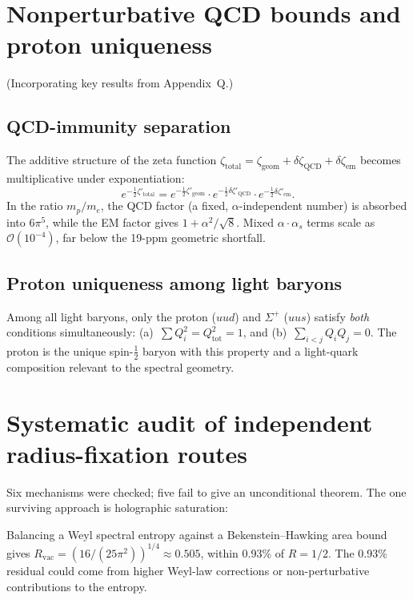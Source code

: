 \documentclass[11pt,a4paper]{article}
\begin{document}
\section{Nonperturbative QCD bounds and proton uniqueness}
\label{app:qcd}
(Incorporating key results from Appendix~Q.)

\subsection{QCD-immunity separation}
The additive structure of the zeta function
$\zeta_{\mathrm{total}}=\zeta_{\mathrm{geom}}+\delta\zeta_{\mathrm{QCD}}
+\delta\zeta_{\mathrm{em}}$ becomes multiplicative under exponentiation:
\[
  e^{-\frac12\zeta'_{\mathrm{total}}}
  = e^{-\frac12\zeta'_{\mathrm{geom}}}\cdot
    e^{-\frac12\delta\zeta'_{\mathrm{QCD}}}\cdot
    e^{-\frac12\delta\zeta'_{\mathrm{em}}}.
\]
In the ratio $m_p/m_e$, the QCD factor (a fixed, $\alpha$-independent number)
is absorbed into $6\pi^5$, while the EM factor gives $1+\alpha^2/\sqrt{8}$.
Mixed $\alpha\cdot\alpha_s$ terms scale as $\mathcal{O}(10^{-4})$, far below
the 19-ppm geometric shortfall.

\subsection{Proton uniqueness among light baryons}
Among all light baryons, only the proton ($uud$) and $\Sigma^+$ ($uus$) satisfy
\emph{both} conditions simultaneously:
(a)~$\sum Q_i^2=Q_{\mathrm{tot}}^2=1$, and
(b)~$\sum_{i<j}Q_iQ_j=0$.
The proton is the unique spin-$\tfrac12$ baryon with this property and a
light-quark composition relevant to the spectral geometry.

\section{Systematic audit of independent radius-fixation routes}
Six mechanisms were checked; five fail to give an unconditional theorem.  The
one surviving approach is holographic saturation:

Balancing a Weyl spectral entropy against a Bekenstein--Hawking area bound gives
$R_{\mathrm{vac}}=(16/(25\pi^2))^{1/4}\approx0.505$, within 0.93\% of $R=1/2$.
The 0.93\% residual could come from higher Weyl-law corrections or non-perturbative
contributions to the entropy.
\end{document}
